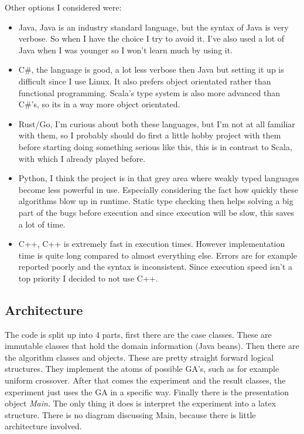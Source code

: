 \documentclass{article}
\begin{document}
\begin{empfile}
Other options I considered were:
\begin{itemize}
	\item Java, Java is an industry standard language, but the syntax of
		Java is very verbose. So when I have the choice I try to avoid it.
		I've also used a lot of Java when I was younger so I won't learn
		much by using it.
	\item C\#, the language is good, a lot less verbose then Java
		but setting it up is difficult since I use Linux.
		It also prefers object orientated rather than
		functional programming. Scala's type system is also more advanced than
		C\#'s, so its in a way more object orientated.
	\item Rust/Go, I'm curious about both these languages, but I'm not at
		all familiar with them, so I probably should do first a little
		hobby project with them before starting doing something serious like
		this, this is in contrast to Scala, with which I already played before.
	\item Python, I think the project is in that grey area where weakly
		typed languages become less powerful in use. Especially considering
		the fact how quickly these algorithms blow up in runtime. Static type
		checking then helps solving a big part of the bugs before execution
		and since execution will be slow, this saves a lot of time.
	\item C++, C++ is extremely fast in execution times. However implementation
		time is quite long compared to almost everything else.
		Errors are for example reported poorly and
		the syntax is inconsistent. Since execution speed isn't a top priority
		I decided to not use C++.
\end{itemize}

\subsection{Architecture}
The code is split up into 4 parts, first there are the case classes. These are
immutable classes that hold the domain information (Java beans).
Then there are the algorithm classes and objects. These are pretty straight
forward logical structures. They implement the atoms of possible GA's, such
as for example uniform crossover. After that comes the experiment and the result
classes, the experiment just uses the GA in a specific way.
Finally there is the presentation object \emph{Main}. The only thing it does
is interpret the experiment into a latex structure. There is no
diagram discussing Main, because there is little architecture involved.


\end{empfile}
\end{document}
